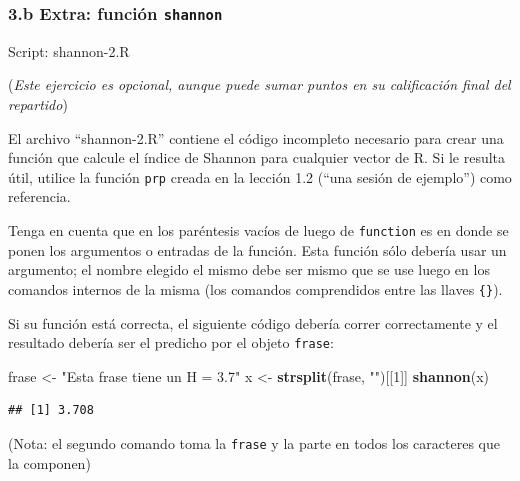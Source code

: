 \documentclass[]{article}
\newenvironment{Shaded}{}{}
\newcommand{\KeywordTok}[1]{\textcolor[rgb]{0.00,0.44,0.13}{\textbf{{#1}}}}
\newcommand{\DecValTok}[1]{\textcolor[rgb]{0.25,0.63,0.44}{{#1}}}
\newcommand{\StringTok}[1]{\textcolor[rgb]{0.25,0.44,0.63}{{#1}}}
\newcommand{\NormalTok}[1]{{#1}}
\begin{document}
\subsubsection{3.b Extra: función \texttt{shannon}}

Script: shannon-2.R

(\emph{Este ejercicio es opcional, aunque puede sumar puntos en su
calificación final del repartido})

El archivo ``shannon-2.R'' contiene el código incompleto necesario para
crear una función que calcule el índice de Shannon para cualquier vector
de R. Si le resulta útil, utilice la función \texttt{prp} creada en la
lección 1.2 (``una sesión de ejemplo'') como referencia.

Tenga en cuenta que en los paréntesis vacíos de luego de
\texttt{function} es en donde se ponen los argumentos o entradas de la
función. Esta función sólo debería usar un argumento; el nombre elegido
el mismo debe ser mismo que se use luego en los comandos internos de la
misma (los comandos comprendidos entre las llaves \texttt{\{\}}).

Si su función está correcta, el siguiente código debería correr
correctamente y el resultado debería ser el predicho por el objeto
\texttt{frase}:

\begin{Shaded}
\begin{Highlighting}[]
\NormalTok{frase <- }\StringTok{"Esta frase tiene un H = 3.7"}
\NormalTok{x <- }\KeywordTok{strsplit}\NormalTok{(frase, }\StringTok{""}\NormalTok{)[[}\DecValTok{1}\NormalTok{]]}
\KeywordTok{shannon}\NormalTok{(x)}
\end{Highlighting}
\end{Shaded}
\begin{verbatim}
## [1] 3.708
\end{verbatim}
(Nota: el segundo comando toma la \texttt{frase} y la parte en todos los
caracteres que la componen)
\end{document}
